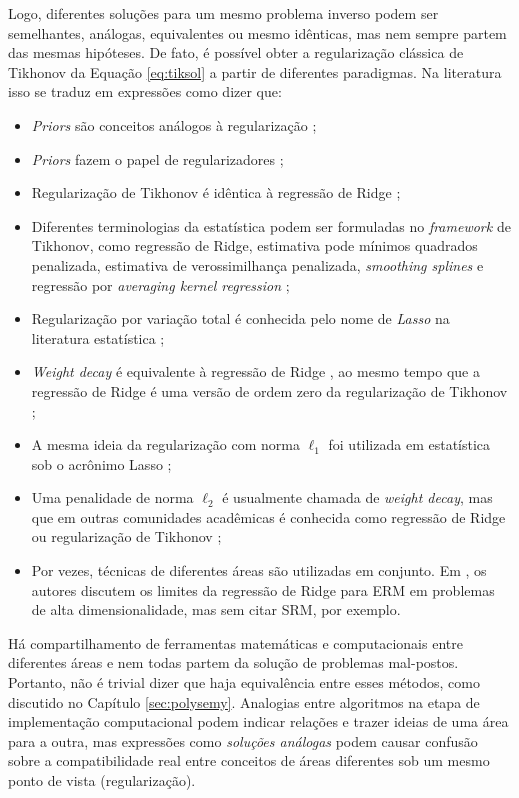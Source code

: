 Logo, diferentes soluções para um mesmo problema inverso podem ser semelhantes, análogas, equivalentes ou mesmo idênticas, mas nem sempre partem das mesmas hipóteses. De fato, é possível obter a regularização clássica de Tikhonov da Equação \eqref{eq:tiksol} a partir de diferentes paradigmas. Na literatura isso se traduz em expressões como dizer que: 
\begin{itemize}
 \item \textit{Priors} são conceitos análogos à regularização \cite{Deisenroth2020}; 
 \item \textit{Priors} fazem o papel de regularizadores \cite{Deisenroth2020}; 
 \item Regularização de Tikhonov é idêntica à regressão de Ridge
 \cite[pág. 133]{aster2019parameter};
 \item Diferentes terminologias da estatística podem ser formuladas no \textit{framework} de Tikhonov, como regressão de Ridge, estimativa pode mínimos quadrados penalizada, estimativa de verossimilhança penalizada, \textit{smoothing splines} e regressão por \textit{averaging kernel regression} \cite{Chen2002}; 
 \item Regularização por variação total é conhecida pelo nome de \textit{Lasso} na literatura estatística \cite[pág. 83]{Mueller2012};
\item \textit{Weight decay} é equivalente à regressão de Ridge , ao mesmo tempo que a regressão de Ridge é uma versão de ordem zero da regularização de Tikhonov \cite[pág. 2820]{Chen2002};
\item A mesma ideia da regularização com norma $\ell_1$ foi utilizada em estatística sob o acrônimo Lasso \cite[pág. 241]{Bertero2021}; 
 \item Uma penalidade de norma $\ell_2$ é usualmente chamada de \textit{weight decay}, mas que em outras comunidades acadêmicas é conhecida como regressão de Ridge ou regularização de Tikhonov \cite{goodfellow2016deep};
 \item Por vezes, técnicas de diferentes áreas são utilizadas em conjunto. Em \cite{Taheri2021}, os autores discutem os limites da regressão de Ridge para ERM em problemas de alta dimensionalidade, mas sem citar SRM, por exemplo.
\end{itemize}

Há compartilhamento de ferramentas matemáticas e computacionais entre diferentes áreas e nem todas partem da solução de problemas mal-postos.  Portanto, não é trivial dizer que haja equivalência entre esses métodos, como discutido no Capítulo \ref{sec:polysemy}. Analogias entre algoritmos na etapa de implementação computacional podem indicar relações e trazer ideias de uma área para a outra, mas expressões como \textit{soluções análogas} podem causar confusão sobre a compatibilidade real entre conceitos de áreas diferentes sob um mesmo ponto de vista (regularização). 

